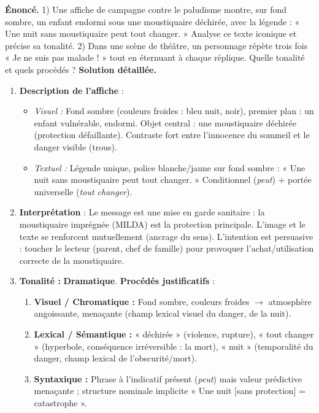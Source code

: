 \documentclass[11pt]{article}
\begin{document}
\begin{exoresolu}
\textbf{Énoncé.} 1) Une affiche de campagne contre le paludisme montre, sur fond sombre, un enfant endormi sous une moustiquaire déchirée, avec la légende : « Une nuit sans moustiquaire peut tout changer. » Analyse ce texte iconique et précise sa tonalité. 2) Dans une scène de théâtre, un personnage répète trois fois « Je ne suis pas malade ! » tout en éternuant à chaque réplique. Quelle tonalité et quels procédés ?
\tcblower
\textbf{Solution détaillée.}
\begin{enumerate}
\item \textbf{Description de l'affiche} :
\begin{itemize}
\item \textit{Visuel :} Fond sombre (couleurs froides : bleu nuit, noir), premier plan : un enfant vulnérable, endormi. Objet central : une moustiquaire déchirée (protection défaillante). Contraste fort entre l'innocence du sommeil et le danger visible (trous).
\item \textit{Textuel :} Légende unique, police blanche/jaune sur fond sombre : « Une nuit sans moustiquaire peut tout changer. » Conditionnel (\emph{peut}) + portée universelle (\emph{tout changer}).
\end{itemize}
\item \textbf{Interprétation} : Le message est une mise en garde sanitaire : la moustiquaire imprégnée (MILDA) est la protection principale. L'image et le texte se renforcent mutuellement (ancrage du sens). L'intention est persuasive : toucher le lecteur (parent, chef de famille) pour provoquer l'achat/utilisation correcte de la moustiquaire.
\item \textbf{Tonalité :} \textbf{Dramatique}.
\textbf{Procédés justificatifs} :
\begin{enumerate}
\item \textbf{Visuel / Chromatique :} Fond sombre, couleurs froides $\rightarrow$ atmosphère angoissante, menaçante (champ lexical visuel du danger, de la nuit).
\item \textbf{Lexical / Sémantique :} « déchirée » (violence, rupture), « tout changer » (hyperbole, conséquence irréversible : la mort), « nuit » (temporalité du danger, champ lexical de l'obscurité/mort).
\item \textbf{Syntaxique :} Phrase à l'indicatif présent (\emph{peut}) mais valeur prédictive menaçante ; structure nominale implicite « Une nuit [sans protection] = catastrophe ».
\end{enumerate}

\end{enumerate}
\end{exoresolu}
\end{document}
